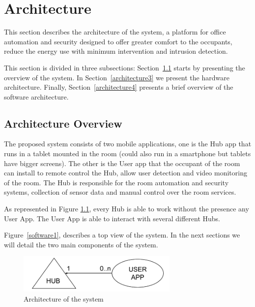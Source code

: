 \chapter{Architecture}
\label{chapter:architecture}

This section describes the architecture of the system, a platform for office automation and security designed to offer greater comfort to the occupants, reduce the energy use with minimum intervention and intrusion detection.

This section is divided in three subsections: Section~\ref{architecture2} starts by presenting the overview of the system. In Section~\ref{architecture3} we present the hardware architecture. Finally, Section~\ref{architecture4} presents a brief overview of the software architecture.


\section{Architecture Overview}\label{architecture2} 


The proposed system consists of two mobile applications, one is the Hub app that runs in a tablet mounted in the room (could also run in a smartphone but tablets have bigger screens). The other is the User app that the occupant of the room can install to remote control the Hub, allow user detection and video monitoring of the room. The Hub is responsible for the room automation and security systems, collection of sensor data and manual control over the room services.


As represented in Figure \ref{architecture_system}, every Hub is able to work without the presence any User App. The User App is able to interact with several different Hubs.

Figure~\ref{software1}, describes a top view of the system. In the next sections we will detail the two main components of the system.

\begin{figure}[h]
\centering
\includegraphics[width=0.7\textwidth]{Figures/system_architecture}
\caption{Architecture of the system}
\label{architecture_system}
\end{figure}

